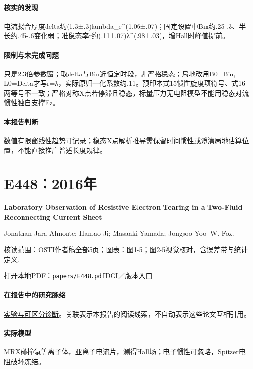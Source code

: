 \documentclass[UTF8,a4paper,11pt,openany,fontset=fandol]{ctexbook}
\begin{document}
\paragraph{核实的发现}电流拟合厚度delta约(1.3±.3)lambda\_e\textasciicircum{}(1.06±.07)；固定设置中Bin约.25-.3、半长约.45-.6变化弱；准稳态率r约(.11±.07)λ\textasciicircum{}(.98±.03)，增Hall时峰值提前。

\paragraph{限制与未完成问题}只是2.3倍参数窗；取delta与Bin近恒定时段，非严格稳态；局地改用B0=Bin, L0=Delta才写r=λ，实际原归一化系数约.11。预印本式15惯性旋度项符号、式16两等号不一致；严格对称X点若停滞且稳态，标量压力无电阻模型不能用稳态对流惯性独自支撑Ez。

\paragraph{本报告判断}数值有限窗线性趋势可记录；稳态X点解析推导需保留时间惯性或澄清局地估算位置，不能直接推广普适长度规律。

\section{E448：2016年}\label{paper:E448}

\textbf{Laboratory Observation of Resistive Electron Tearing in a Two-Fluid Reconnecting Current Sheet}\citep{E448}\

Jonathan Jara-Almonte;  Hantao Ji;  Masaaki Yamada;  Jongsoo Yoo;  W. Fox.

\textsf{核读范围：}OSTI作者稿全部5页；\textsf{图表：}图1-5；图2-5视觉核对，含误差带与统计定义.

\href{run:../papers/E448.pdf}{打开本地PDF：\texttt{papers/E448.pdf}}\quad\href{https://doi.org/10.1103/physrevlett.117.095001}{DOI／版本入口}

\paragraph{在报告中的研究脉络}\hyperref[story:diagnostic]{实验与可区分诊断}。关联表示本报告的阅读线索，不自动表示这些论文互相引用。

\paragraph{实际模型}MRX碰撞氩等离子体，亚离子电流片，测得Hall场；电子惯性可忽略，Spitzer电阻破坏冻结。
\end{document}
